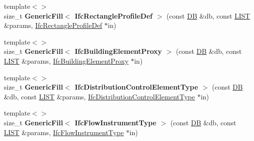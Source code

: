 \begin{DoxyCompactItemize}
\item 
\hypertarget{namespace_assimp_1_1_s_t_e_p_a542617c78ea924675faa65b396ef7d4a}{{\footnotesize template$<$$>$ }\\size\+\_\+t {\bfseries Generic\+Fill$<$ Ifc\+Rectangle\+Profile\+Def $>$} (const \hyperlink{class_assimp_1_1_s_t_e_p_1_1_d_b}{D\+B} \&db, const \hyperlink{class_assimp_1_1_s_t_e_p_1_1_e_x_p_r_e_s_s_1_1_l_i_s_t}{L\+I\+S\+T} \&params, \hyperlink{struct_assimp_1_1_i_f_c_1_1_ifc_rectangle_profile_def}{Ifc\+Rectangle\+Profile\+Def} $\ast$in)}\label{namespace_assimp_1_1_s_t_e_p_a542617c78ea924675faa65b396ef7d4a}

\item 
\hypertarget{namespace_assimp_1_1_s_t_e_p_a29f5054c8f8ca111b52de0c809561b71}{{\footnotesize template$<$$>$ }\\size\+\_\+t {\bfseries Generic\+Fill$<$ Ifc\+Building\+Element\+Proxy $>$} (const \hyperlink{class_assimp_1_1_s_t_e_p_1_1_d_b}{D\+B} \&db, const \hyperlink{class_assimp_1_1_s_t_e_p_1_1_e_x_p_r_e_s_s_1_1_l_i_s_t}{L\+I\+S\+T} \&params, \hyperlink{struct_assimp_1_1_i_f_c_1_1_ifc_building_element_proxy}{Ifc\+Building\+Element\+Proxy} $\ast$in)}\label{namespace_assimp_1_1_s_t_e_p_a29f5054c8f8ca111b52de0c809561b71}

\item 
\hypertarget{namespace_assimp_1_1_s_t_e_p_a3c98d1ecbfb6da5379cc6b608efbf72c}{{\footnotesize template$<$$>$ }\\size\+\_\+t {\bfseries Generic\+Fill$<$ Ifc\+Distribution\+Control\+Element\+Type $>$} (const \hyperlink{class_assimp_1_1_s_t_e_p_1_1_d_b}{D\+B} \&db, const \hyperlink{class_assimp_1_1_s_t_e_p_1_1_e_x_p_r_e_s_s_1_1_l_i_s_t}{L\+I\+S\+T} \&params, \hyperlink{struct_assimp_1_1_i_f_c_1_1_ifc_distribution_control_element_type}{Ifc\+Distribution\+Control\+Element\+Type} $\ast$in)}\label{namespace_assimp_1_1_s_t_e_p_a3c98d1ecbfb6da5379cc6b608efbf72c}

\item 
\hypertarget{namespace_assimp_1_1_s_t_e_p_a85eecfc79e212bf3240a00f40e71a7fa}{{\footnotesize template$<$$>$ }\\size\+\_\+t {\bfseries Generic\+Fill$<$ Ifc\+Flow\+Instrument\+Type $>$} (const \hyperlink{class_assimp_1_1_s_t_e_p_1_1_d_b}{D\+B} \&db, const \hyperlink{class_assimp_1_1_s_t_e_p_1_1_e_x_p_r_e_s_s_1_1_l_i_s_t}{L\+I\+S\+T} \&params, \hyperlink{struct_assimp_1_1_i_f_c_1_1_ifc_flow_instrument_type}{Ifc\+Flow\+Instrument\+Type} $\ast$in)}\label{namespace_assimp_1_1_s_t_e_p_a85eecfc79e212bf3240a00f40e71a7fa}


\end{DoxyCompactItemize}
